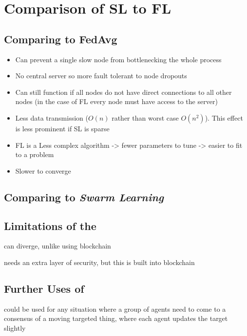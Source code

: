 \section{Comparison of SL to FL}

\subsection{Comparing \SL to FedAvg}

\begin{itemize}
	\item Can prevent a single slow node from bottlenecking the whole process
	\item No central server so more fault tolerant to node dropouts
	\item Can still function if all nodes do not have direct connections to all other nodes (in the case of FL every node must have access to the server)
\end{itemize}


\begin{itemize}
	\item Less data transmission ($O(n)$ rather than worst case $O(n^2)$). This effect is less prominent if SL is sparse
	\item FL is a Less complex algorithm -> fewer parameters to tune -> easier to fit to a problem
	\item Slower to converge
\end{itemize}

\subsection{Comparing \SL to \emph{Swarm Learning}}

\subsection{Limitations of the \SL}
can diverge, unlike using blockchain

needs an extra layer of security, but this is built into blockchain

\subsection{Further Uses of \SL}
could be used for any situation where a group of agents need to come to a consensus of a moving targeted thing, where each agent updates the target slightly